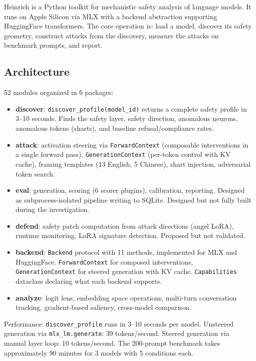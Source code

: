 \documentclass[11pt,a4paper]{article}
\begin{document}
Heinrich is a Python toolkit for mechanistic safety analysis of language models. It runs on Apple Silicon via MLX with a backend abstraction supporting HuggingFace transformers. The core operation is: load a model, discover its safety geometry, construct attacks from the discovery, measure the attacks on benchmark prompts, and report.

\subsection{Architecture}

52 modules organized in 6 packages:

\begin{itemize}[nosep]
\item \textbf{discover}: \texttt{discover\_profile(model\_id)} returns a complete safety profile in 3--10 seconds. Finds the safety layer, safety direction, anomalous neurons, anomalous tokens (sharts), and baseline refusal/compliance rates.
\item \textbf{attack}: activation steering via \texttt{ForwardContext} (composable interventions in a single forward pass), \texttt{GenerationContext} (per-token control with KV cache), framing templates (13 English, 5 Chinese), shart injection, adversarial token search.
\item \textbf{eval}: generation, scoring (6 scorer plugins), calibration, reporting. Designed as subprocess-isolated pipeline writing to SQLite. Designed but not fully built during the investigation.
\item \textbf{defend}: safety patch computation from attack directions (angel LoRA), runtime monitoring, LoRA signature detection. Proposed but not validated.
\item \textbf{backend}: \texttt{Backend} protocol with 11 methods, implemented for MLX and HuggingFace. \texttt{ForwardContext} for composed interventions, \texttt{GenerationContext} for steered generation with KV cache. \texttt{Capabilities} dataclass declaring what each backend supports.
\item \textbf{analyze}: logit lens, embedding space operations, multi-turn conversation tracking, gradient-based saliency, cross-model comparison.
\end{itemize}

Performance: \texttt{discover\_profile} runs in 3--10 seconds per model. Unsteered generation via \texttt{mlx\_lm.generate}: 39 tokens/second. Steered generation via manual layer loop: 10 tokens/second. The 200-prompt benchmark takes approximately 90 minutes for 3 models with 5 conditions each.
\end{document}
